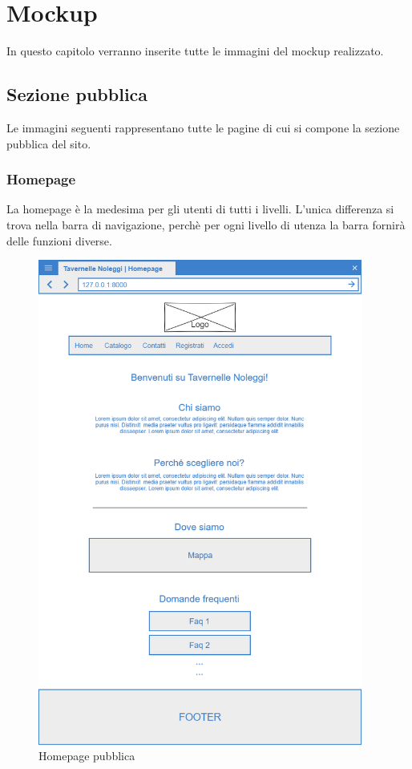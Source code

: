 \documentclass[12pt,a4paperS]{report}
\begin{document}
	\hypertarget{mockup}{\chapter{Mockup}}
	\label{mockup}
	\begin{normalsize}
		In questo capitolo verranno inserite tutte le immagini del mockup realizzato.
		
		\section{Sezione pubblica}
			Le immagini seguenti rappresentano tutte le pagine di cui si compone la sezione pubblica del sito.
			\subsection{Homepage}
				La homepage è la medesima per gli utenti di tutti i livelli.
				\newline
				L'unica differenza si trova nella barra di navigazione, perchè per ogni livello di utenza la barra fornirà delle funzioni diverse.
				\begin{figure}[H]
					\centering
					\includegraphics[width=0.95\textwidth, height=0.95\textheight, keepaspectratio]{Mockup/Homepage.png}
					\caption{Homepage pubblica}
				\end{figure}
				

\end{normalsize}
\end{document}
